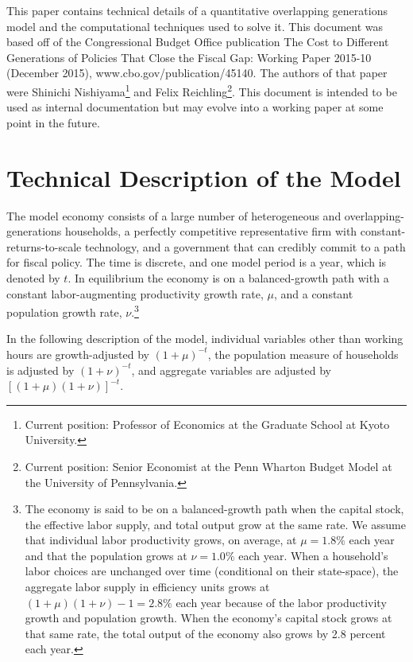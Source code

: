 \documentclass[11pt,leqno,fleqn]{article}
\begin{document}
\noindent This paper contains technical details of a quantitative overlapping generations model and the computational techniques used to solve it. This document was based off of the Congressional Budget Office publication The Cost to Different Generations of Policies That Close the Fiscal Gap: Working Paper 2015-10 (December 2015), www.cbo.gov/publication/45140. The authors of that paper were Shinichi Nishiyama\footnote{Current position: Professor of Economics at the Graduate School at Kyoto University.} and Felix Reichling\footnote{Current position: Senior Economist at the Penn Wharton Budget Model at the University of Pennsylvania.}. This document is intended to be used as internal documentation but may evolve into a working paper at some point in the future.
\\


\newpage

\pagestyle{plain}
\setcounter{page}{1}

\section{Technical Description of the Model}\label{Section:Model Description}

The model economy consists of a large number of heterogeneous and overlapping-generations households, a perfectly competitive representative firm with constant-returns-to-scale technology, and a government that can credibly commit to a path for fiscal policy. The time is discrete, and one model period is a year, which is denoted by $t$. In equilibrium the economy is on a balanced-growth path with a constant labor-augmenting productivity growth rate, $\mu$, and a constant population growth rate, $\nu$.\footnote{\label{FN:g_adj1} The economy is said to be on a balanced-growth path when the capital stock, the effective labor supply, and total output grow at the same rate. We assume that individual labor productivity grows, on average, at $\mu=1.8\%$ each year and that the population grows at $\nu=1.0\%$ each year. When a household's labor choices are unchanged over time (conditional on their state-space), the aggregate labor supply in efficiency units grows at $(1+\mu)(1+\nu)-1=2.8\%$ each year because of the labor productivity growth and population growth. When the economy's capital stock grows at that same rate, the total output of the economy also grows by 2.8 percent each year. }

In the following description of the model, individual variables other than working hours are growth-adjusted by $(1+\mu)^{-t}$, the population measure of households is adjusted by $(1+\nu)^{-t}$, and aggregate variables are adjusted by $[(1+\mu)(1+\nu)]^{-t}$.
\end{document}
